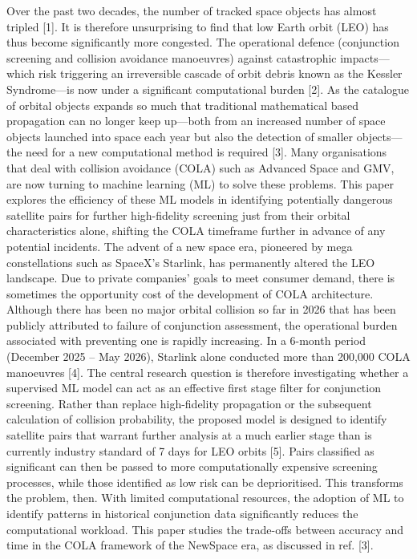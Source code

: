 Over the past two decades, the number of tracked space objects has almost tripled [1]. It is therefore unsurprising to find that low Earth orbit (LEO) has thus become significantly more congested. The operational defence (conjunction screening and collision avoidance manoeuvres) against catastrophic impacts—which risk triggering an irreversible cascade of orbit debris known as the Kessler Syndrome—is now under a significant computational burden [2]. As the catalogue of orbital objects expands so much that traditional mathematical based propagation can no longer keep up—both from an increased number of space objects launched into space each year but also the detection of smaller objects—the need for a new computational method is required [3]. Many organisations that deal with collision avoidance (COLA) such as Advanced Space and GMV, are now turning to machine learning (ML) to solve these problems. This paper explores the efficiency of these ML models in identifying potentially dangerous satellite pairs for further high-fidelity screening just from their orbital characteristics alone, shifting the COLA timeframe further in advance of any potential incidents.
The advent of a new space era, pioneered by mega constellations such as SpaceX’s Starlink, has permanently altered the LEO landscape. Due to private companies’ goals to meet consumer demand, there is sometimes the opportunity cost of the development of COLA architecture. Although there has been no major orbital collision so far in 2026 that has been publicly attributed to failure of conjunction assessment, the operational burden associated with preventing one is rapidly increasing. In a 6-month period (December 2025 – May 2026), Starlink alone conducted more than 200,000 COLA manoeuvres [4].
The central research question is therefore investigating whether a supervised ML model can act as an effective first stage filter for conjunction screening. Rather than replace high-fidelity propagation or the subsequent calculation of collision probability, the proposed model is designed to identify satellite pairs that warrant further analysis at a much earlier stage than is currently industry standard of 7 days for LEO orbits [5]. Pairs classified as significant can then be passed to more computationally expensive screening processes, while those identified as low risk can be deprioritised. This transforms the problem, then. With limited computational resources, the adoption of ML to identify patterns in historical conjunction data significantly reduces the computational workload. This paper studies the trade-offs between accuracy and time in the COLA framework of the NewSpace era, as discussed in ref. [3].
